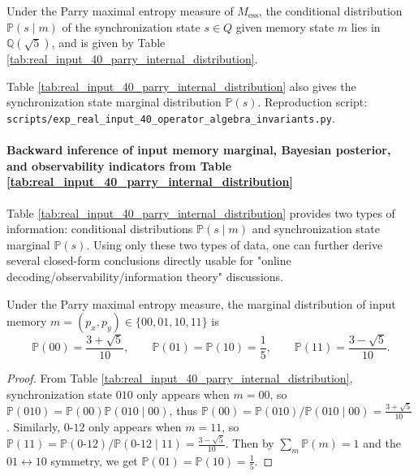 \begin{proposition}\label{prop:real-input-40-parry-internal-distribution}
Under the Parry maximal entropy measure of $M_{\mathrm{ess}}$, the conditional distribution $\mathbb{P}(s\mid m)$ of the synchronization state $s\in Q$ given memory state $m$ lies in $\mathbb Q(\sqrt5)$,
and is given by Table \ref{tab:real_input_40_parry_internal_distribution}.
\end{proposition}

\begin{remark}\label{rem:real-input-40-parry-internal-distribution-repro}
Table \ref{tab:real_input_40_parry_internal_distribution} also gives the synchronization state marginal distribution $\mathbb{P}(s)$.
Reproduction script: \texttt{scripts/exp\_real\_input\_40\_operator\_algebra\_invariants.py}.
\end{remark}


\paragraph{Backward inference of input memory marginal, Bayesian posterior, and observability indicators from Table \ref{tab:real_input_40_parry_internal_distribution}}
Table \ref{tab:real_input_40_parry_internal_distribution} provides two types of information: conditional distributions $\mathbb{P}(s\mid m)$ and synchronization state marginal $\mathbb{P}(s)$.
Using only these two types of data, one can further derive several closed-form conclusions directly usable for "online decoding/observability/information theory" discussions.

\begin{proposition}\label{prop:real-input-40-memory-marginal}
Under the Parry maximal entropy measure, the marginal distribution of input memory $m=(p_x,p_y)\in\{00,01,10,11\}$ is
\[
\mathbb{P}(00)=\frac{3+\sqrt5}{10},\qquad
\mathbb{P}(01)=\mathbb{P}(10)=\frac15,\qquad
\mathbb{P}(11)=\frac{3-\sqrt5}{10}.
\]
\end{proposition}

\begin{proof}
From Table \ref{tab:real_input_40_parry_internal_distribution}, synchronization state $010$ only appears when $m=00$, so
\(
\mathbb{P}(010)=\mathbb{P}(00)\mathbb{P}(010\mid 00)
\),
thus
\(
\mathbb{P}(00)=\mathbb{P}(010)/\mathbb{P}(010\mid 00)=\frac{3+\sqrt5}{10}
\).
Similarly, $0$-$12$ only appears when $m=11$, so
\(
\mathbb{P}(11)=\mathbb{P}(0\text{-}12)/\mathbb{P}(0\text{-}12\mid 11)=\frac{3-\sqrt5}{10}
\).
Then by $\sum_m \mathbb{P}(m)=1$ and the $01\leftrightarrow 10$ symmetry, we get $\mathbb{P}(01)=\mathbb{P}(10)=\frac15$.
\end{proof}


